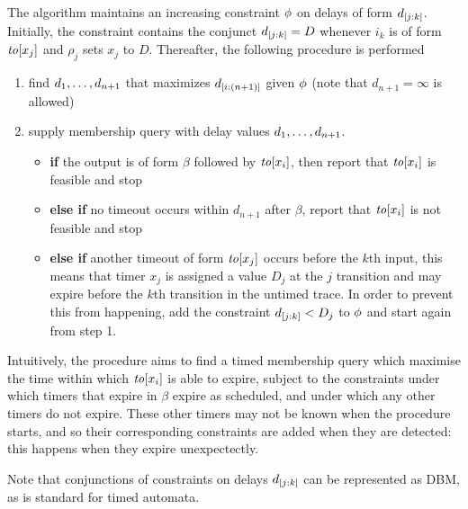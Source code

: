 The algorithm maintains an increasing constraint $\phi$ on delays of form
$d_{[j:k]}$. Initially, the constraint contains the conjunct
$d_{[j:k]} = D$ whenever $i_k$ is of form $\mathit{to}[x_j]$ and
$\rho_j$ sets $x_j$ to $D$.
Thereafter, the following procedure is performed
  \begin{enumerate}
  \item
    find ${d}_1 , \ldots , {d}_{{n+1}}$ that maximizes $d_{[i:(n+1)]}$ given
    $\phi$ (note that $d_{n+1} = \infty$ is allowed)
  \item
    supply membership query with delay values ${d}_1 , \ldots , {d}_{{n+1}}$.
\begin{itemize}
  \item
    {\bf if} the output is of form $\beta$ followed by $\mathit{to}[x_i]$, then
    report that $\mathit{to}[x_i]$ is feasible and stop
  \item
    {\bf else if} no timeout occurs within $d_{n+1}$ after $\beta$, report
    that $\mathit{to}[x_i]$ is not feasible and stop
  \item
    {\bf else if} another timeout of form $\mathit{to}[x_j]$ occurs before
    the $k$th input, this means that timer $x_j$ is assigned a value
    $D_j$ at the $j$ transition and may expire before the $k$th transition
    in the untimed trace. In order to prevent this from happening,
    add the constraint $d_{[j:k]} < D_j$ to $\phi$ and start again
    from step 1.
\end{itemize}
  \end{enumerate}
  Intuitively, the procedure aims to find a timed membership query which maximise
  the time within which $\mathit{to}[x_i]$ is able to expire,
  subject to the constraints under which timers that expire in $\beta$ expire
  as scheduled, and under which any other timers do not expire. These
  other timers may not be known when the procedure starts, and so their
  corresponding constraints are added when they are detected: this happens
  when they expire unexpectectly.

  Note that conjunctions of constraints on delays $d_{[j:k]}$ can be represented as DBM, as is standard for timed automata.




